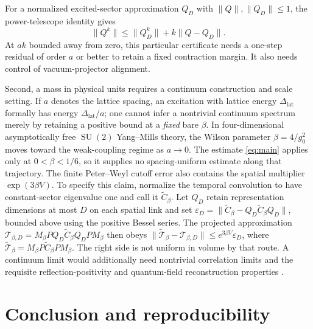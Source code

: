 \documentclass[11pt,a4paper]{article}
\numberwithin{equation}{section}
\newcommand{\SU}{\operatorname{SU}(2)}
\begin{document}
For a normalized excited-sector approximation \(Q_D\)
with \(\|Q\|,\|Q_D\|\leq1\), the power-telescope identity
gives
\begin{equation}
 \|Q^k\|\leq\|Q_D^k\|+k\|Q-Q_D\|.             \label{eq:bridgeerror}
\end{equation}
At \(ak\) bounded away from zero, this particular
certificate needs a one-step residual of order \(a\)
or better to retain a fixed contraction margin. It
also needs control of vacuum-projector alignment.

Second, a mass in physical units requires a
continuum construction and scale setting.
If \(a\) denotes the lattice spacing, an
excitation with lattice energy \(\Delta_{\mathrm{lat}}\)
formally has energy \(\Delta_{\mathrm{lat}}/a\);
one cannot infer a nontrivial continuum spectrum
merely by retaining a positive bound at a
\emph{fixed} bare \(\beta\). In four-dimensional
asymptotically free \(\SU\) Yang--Mills theory,
the Wilson parameter \(\beta=4/g_0^2\) moves
toward the weak-coupling regime as \(a\to0\).
The estimate \eqref{eq:main} applies only at
\(0<\beta<1/6\), so it supplies no
spacing-uniform estimate along that trajectory.
The finite Peter--Weyl cutoff error also contains
the spatial multiplier \(\exp(3\beta V)\).
To specify this claim, normalize the temporal convolution
to have constant-sector eigenvalue one and call it
\(\widetilde C_\beta\). Let \(Q_D\) retain representation
dimensions at most \(D\) on each spatial link and set
\(\varepsilon_D=\|\widetilde C_\beta-
Q_D\widetilde C_\beta Q_D\|\), bounded above using the
positive Bessel series. The projected approximation
\(\mathcal T_{\beta,D}
=M_\beta P Q_D\widetilde C_\beta Q_D P M_\beta\)
then obeys
\(\|\widetilde{\mathcal T}_\beta-\mathcal T_{\beta,D}\|
\leq e^{3\beta V}\varepsilon_D\),
where \(\widetilde{\mathcal T}_\beta
=M_\beta P\widetilde C_\beta P M_\beta\).
The right side is not uniform in volume by that
route. A continuum limit would
additionally need nontrivial correlation limits
and the requisite reflection-positivity and
quantum-field reconstruction properties
\cite{JaffeWitten,Chatterjee}.

\section{Conclusion and reproducibility}
\end{document}
